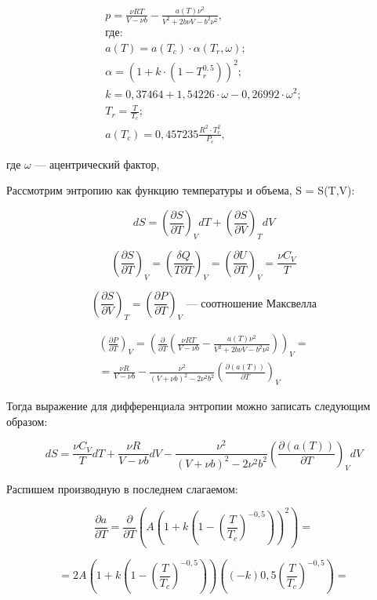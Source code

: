 \documentclass[a4paper,14pt]{article}
\theoremstyle{plain} %
\theoremstyle{definition} %
\theoremstyle{remark} %
\begin{document}
\begin{gather*}
	p = \frac{\nu R T}{V - \nu b} - \frac{a(T) \nu^2}{V^2 + 2 b \nu V - b^2 \nu^2}, \\
	\textrm{где:} \\
	a(T) = a (T_c) \cdot \alpha(T_r, \omega);\\
	\alpha = (1 + k \cdot (1 - T_r^{0,5}))^2;\\
	k = 0,37464 + 1,54226 \cdot \omega - 0,26992 \cdot \omega^2;\\
	T_r = \frac{T}{T_c};\\
	a(T_c) = 0,457235 \frac{R^2 \cdot T_c^2}{P_c},
\end{gather*}

где $\omega$ --- ацентрический фактор, 

Рассмотрим энтропию как функцию температуры и объема,  S = S(T,V):

$$ d S = \left(\frac{\partial S}{\partial T}\right)_V d T + \left(\frac{\partial S}{\partial V}\right)_T d V $$

$$ \left(\frac{\partial S}{\partial T}\right)_V = \left(\frac{\delta Q}{T \partial T}\right)_V = \left(\frac{\partial U}{\partial T}\right)_V = \frac{\nu C_V}{T} $$

$$ \left(\frac{\partial S}{\partial V}\right)_T = \left(\frac{\partial P}{\partial T}\right)_V \textrm{ --- соотношение Максвелла} $$

\begin{gather*}
\left(\frac{\partial P}{\partial T}\right)_V = \left(\frac{\partial}{\partial T}\left(\frac{\nu R T}{V - \nu b} - \frac{a(T) \nu^2}{V^2 + 2 b \nu V - b^2 \nu^2}\right)\right)_V = \\
= \frac{\nu R}{V - \nu b} - \frac{\nu^2}{(V + \nu b)^2 - 2 \nu^2 b^2} \left( \frac{\partial( a(T))}{\partial T} \right)_V
\end{gather*} 

Тогда выражение для дифференциала энтропии можно записать следующим образом:

$$ d S = \frac{\nu C_V}{T} d T + \frac{\nu R}{V - \nu b} d V - \frac{\nu^2}{(V + \nu b)^2 - 2 \nu^2 b^2} \left( \frac{\partial( a(T))}{\partial T} \right)_V d V $$

Распишем производную в последнем слагаемом:

$$ \frac{\partial a}{\partial T} = \frac{\partial}{\partial T} \left( A \left(1 + k \left(1 - \left( \frac{T}{T_c} \right)^{-0,5}\right)\right)^2 \right) = $$

$$ = 2 A \left(1 + k \left(1 - \left( \frac{T}{T_c} \right)^{-0,5}\right)\right) \left( (- k) 0,5 \left( \frac{T}{T_c} \right)^{-0,5}  \right) = $$
\end{document}

